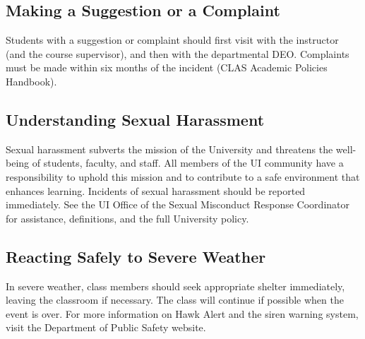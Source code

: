 \documentclass[10pt]{article}
\begin{document}
\subsection*{Making a Suggestion or a Complaint}
Students with a suggestion or complaint should first visit with the instructor
(and the course supervisor), and then with the departmental DEO. Complaints
must be made within six months of the incident (CLAS Academic Policies
Handbook).

\subsection*{Understanding Sexual Harassment}
Sexual harassment subverts the mission of the University and threatens the
well-being of students, faculty, and staff. All members of the UI community
have a responsibility to uphold this mission and to contribute to a safe
environment that enhances learning. Incidents of sexual harassment should be
reported immediately. See the UI Office of the Sexual Misconduct Response
Coordinator for assistance, definitions, and the full University policy.

\subsection*{Reacting Safely to Severe Weather}
In severe weather, class members should seek appropriate shelter immediately,
leaving the classroom if necessary. The class will continue if possible when
the event is over. For more information on Hawk Alert and the siren warning
system, visit the Department of Public Safety website.
\end{document}
